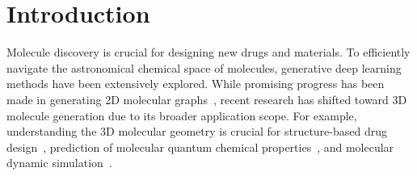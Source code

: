 \section{Introduction}

Molecule discovery is crucial for designing new drugs and materials. To efficiently navigate the astronomical chemical space of molecules, generative deep learning methods have been extensively explored. While promising progress has been made in generating 2D molecular graphs~\citep{JT-VAE, DiGress},
recent research has shifted toward 3D molecule generation due to its broader application scope.
For example, understanding the 3D molecular geometry is crucial for structure-based drug design~\citep{zhang2023molecule}, prediction of molecular quantum chemical properties~\citep{UniMol}, and molecular dynamic simulation~\citep{hansson2002molecular}.





